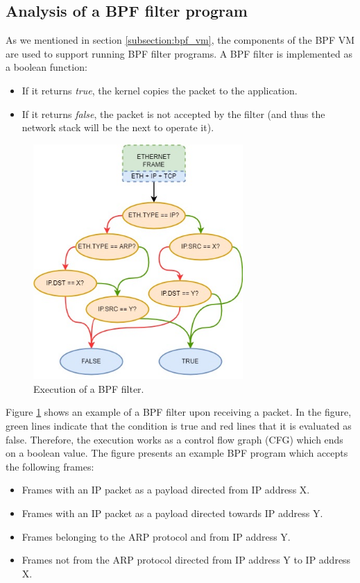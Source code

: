 \documentclass[12pt]{report} %
\begin{document}
\subsection{Analysis of a BPF filter program} \label{subsection:analysis_bpf_filter_prog}
As we mentioned in section \ref{subsection:bpf_vm}, the components of the BPF VM are used to support running BPF filter programs. A BPF filter is implemented as a boolean function:
\begin{itemize}
\item If it returns \textit{true}, the kernel copies the packet to the application.
\item If it returns \textit{false}, the packet is not accepted by the filter (and thus the network stack will be the next to operate it).
\end{itemize}

\begin{figure}[H]
	\centering
	\includegraphics[width=8cm]{cbpf_prog.jpg}
	\caption{Execution of a BPF filter.}
	\label{fig:cbpf_prog}
\end{figure}

Figure \ref{fig:cbpf_prog} shows an example of a BPF filter upon receiving a packet. In the figure, green lines indicate that the condition is true and red lines that it is evaluated as false. Therefore, the execution works as a control flow graph (CFG) which ends on a boolean value\cite{bpf_bsd_origin_bpf_page5}. The figure presents an example BPF program which accepts the following frames:
\begin{itemize}
\item Frames with an IP packet as a payload directed from IP address X.
\item Frames with an IP packet as a payload directed towards IP address Y.
\item Frames belonging to the ARP protocol and from IP address Y.
\item Frames not from the ARP protocol directed from IP address Y to IP address X.
\end{itemize}
\end{document}
